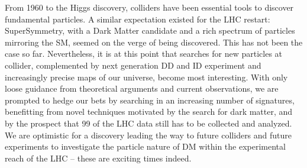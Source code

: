 
From 1960 to the Higgs discovery, colliders have been essential tools to discover fundamental particles.
A similar expectation existed for the LHC restart: SuperSymmetry, with a Dark Matter candidate and a rich spectrum of particles mirroring the SM, seemed on the verge of being discovered.
This has not been the case so far.
Nevertheless, it is at this point that searches for new particles at collider, complemented by next generation DD and ID experiment and increasingly precise maps of our universe, become most interesting.
With only loose guidance from theoretical arguments and current observations, we are prompted to hedge our bets by searching in an increasing number of signatures, benefitting from novel techniques motivated by the search for dark matter, and by the prospect that 99\? of the LHC data still has to be collected and analyzed.
We are optimistic for a discovery leading the way to future colliders and future experiments to investigate the particle nature of DM within the experimental reach of the LHC -- these are exciting times indeed. 
